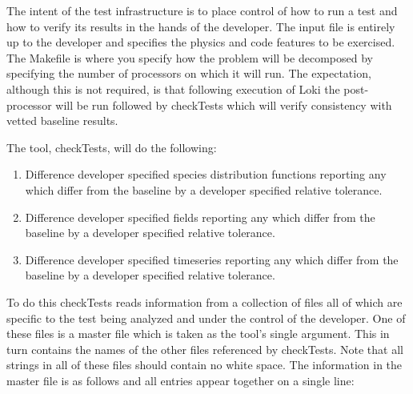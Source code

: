 \documentclass[11pt]{amsart}
\begin{document}
The intent of the test infrastructure is to place control of how to run a test
and how to verify its results in the hands of the developer.  The input file is
entirely up to the developer and specifies the physics and code features to be
exercised.  The Makefile is where you specify how the problem will be decomposed
by specifying the number of processors on which it will run.  The expectation,
although this is not required, is that following execution of Loki the
post-processor will be run followed by checkTests which will verify consistency
with vetted baseline results.

The tool, checkTests, will do the following:
\begin{enumerate}
\item Difference developer specified species distribution functions reporting
any which differ from the baseline by a developer specified relative tolerance.
\item Difference developer specified fields reporting any which differ from the
baseline by a developer specified relative tolerance.
\item Difference developer specified timeseries reporting any which differ from
the baseline by a developer specified relative tolerance.
\end{enumerate}
To do this checkTests reads information from a collection of files all of which
are specific to the test being analyzed and under the control of the developer.
One of these files is a master file which is taken as the tool's single
argument.  This in turn contains the names of the other files referenced by
checkTests.  Note that all strings in all of these files should contain no white
space.  The information in the master file is as follows and all entries appear
together on a single line:
\end{document}
